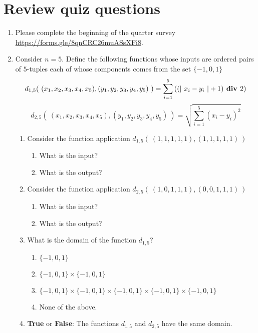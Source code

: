 \documentclass[12pt, oneside]{article}
\begin{document}
\section*{Review quiz questions}
\begin{enumerate}
\item Please complete the beginning of the quarter survey 
\href{https://forms.gle/8qnCRC26muASsXFi8}{https://forms.gle/8qnCRC26muASsXFi8}.

\item Consider $n=5$.  Define the following functions whose inputs are ordered pairs of $5$-tuples each of whose components
comes from the set $\{-1,0,1\}$
\[
d_{1,5}(~ (x_1, x_2, x_3, x_4, x_5) , (y_1, y_2, y_3, y_4, y_5) ~) =  \sum_{i=1}^5\left( (\lvert~x_i-y_i~\rvert + 1) \textbf{ div } 2 \right)
\]
\[
d_{2,5}(~ (x_1, x_2, x_3, x_4, x_5) , (y_1, y_2, y_3, y_4, y_5) ~) =  \sqrt{ \sum_{i=1}^5 (x_i - y_i)^2}
\]

\begin{enumerate}
\item Consider the function application $d_{1,5} (~ (1,1,1,1,1), (1,1,1,1,1) ~)$
\begin{enumerate}
\item What is the input? 
\item What is the output?
\end{enumerate}

\item Consider the function application $d_{2,5} (~ (1,0,1,1,1), (0, 0,1,1,1) ~)$
\begin{enumerate}
\item What is the input? 
\item What is the output?
\end{enumerate}
\item What is the domain of the function $d_{1,5}$?
\begin{enumerate}
\item $\{-1,0,1\}$
\item $\{-1,0,1\} \times \{-1,0,1\}$
\item $\{-1,0,1\} \times \{-1,0,1\}\times \{-1,0,1\}\times \{-1,0,1\}\times \{-1,0,1\}$
\item None of the above.
\end{enumerate}

\item {\bf True} or {\bf False}: The functions $d_{1,5}$ and $d_{2,5}$ have the same domain.
\end{enumerate}


\end{enumerate}
\end{document}
